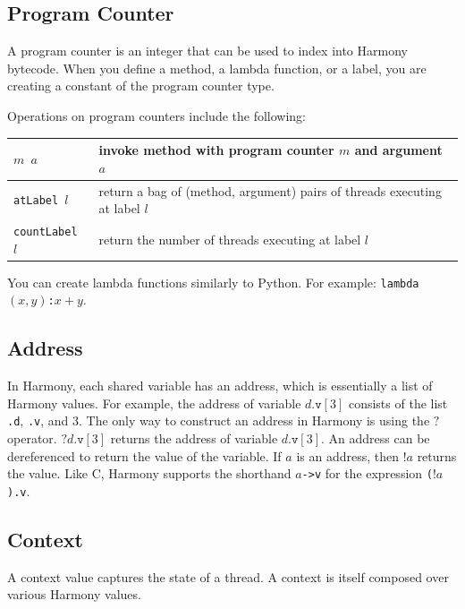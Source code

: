 \documentclass{report}
\begin{document}
\subsection*{Program Counter}

A program counter is an integer that can be used to index into Harmony
bytecode.  When you define a method, a lambda function, or a label,
you are creating a constant of the program counter type.

Operations on program counters include the following:
\begin{center}
\begin{tabular}{|l|l|}
\hline
\texttt{$m$ $a$} & invoke method with program counter $m$ and argument $a$\\
\hline
\texttt{atLabel $l$} & return a bag of (method, argument) pairs of threads executing at label $l$ \\
\texttt{countLabel $l$} & return the number of threads executing at label $l$ \\
\hline
\end{tabular}
\end{center}

You can create lambda functions similarly to Python.  For example:
\texttt{lambda$(x,y)$:$x+y$}.

\subsection*{Address}

In Harmony, each shared variable has an address, which is essentially
a list of Harmony values.
For example, the address of variable $d.\mathtt{v}[3]$ consists of the
list \texttt{.d}, \texttt{.v}, and 3.  The only way to construct an
address in Harmony is using the $?$ operator.
$?d.\mathtt{v}[3]$ returns the address of variable $d.\mathtt{v}[3]$.
An address can be dereferenced to return the value of the variable.
If $a$ is an address, then $!a$ returns the value.
Like C, Harmony supports the shorthand \texttt{$a$->v} for 
the expression \texttt{($!a$).v}.

\subsection*{Context}

A context value captures the state of a thread.
A context is itself composed over various Harmony values.
\end{document}
